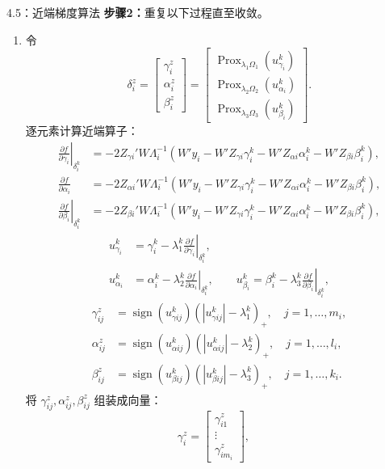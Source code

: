 \begin{bookalgorithm}{4.5：近端梯度算法}
\textbf{步骤2：}重复以下过程直至收敛。
\begin{enumerate}
\item 令
\[
\delta_i^z=\begin{bmatrix}\gamma_i^z\\\alpha_i^z\\\beta_i^z\end{bmatrix}
=\begin{bmatrix}
\operatorname{Prox}_{\lambda_1\Omega_1}(u_{\gamma_i}^k)\\
\operatorname{Prox}_{\lambda_2\Omega_2}(u_{\alpha_i}^k)\\
\operatorname{Prox}_{\lambda_3\Omega_3}(u_{\beta_i}^k)
\end{bmatrix}.
\]
逐元素计算近端算子：
\[
\begin{aligned}
\left.\frac{\partial f}{\partial\gamma_i}\right|_{\delta_i^k}
 &=-2Z_{\gamma i}'W\Lambda_i^{-1}
 (W'y_i-W'Z_{\gamma i}\gamma_i^k-W'Z_{\alpha i}\alpha_i^k-W'Z_{\beta i}\beta_i^k),\\
\frac{\partial f}{\partial\alpha_i}
 &=-2Z_{\alpha i}'W\Lambda_i^{-1}
 (W'y_i-W'Z_{\gamma i}\gamma_i^k-W'Z_{\alpha i}\alpha_i^k-W'Z_{\beta i}\beta_i^k),\\
\left.\frac{\partial f}{\partial\beta_i}\right|_{\delta_i^k}
 &=-2Z_{\beta i}'W\Lambda_i^{-1}
 (W'y_i-W'Z_{\gamma i}\gamma_i^k-W'Z_{\alpha i}\alpha_i^k-W'Z_{\beta i}\beta_i^k),
\end{aligned}
\]
\[
\begin{aligned}
u_{\gamma_i}^k&=\gamma_i^k-\lambda_1^k\left.\frac{\partial f}{\partial\gamma_i}\right|_{\delta_i^k},\\
u_{\alpha_i}^k&=\alpha_i^k-\lambda_2^k\left.\frac{\partial f}{\partial\alpha_i}\right|_{\delta_i^k},\qquad
u_{\beta_i}^k=\beta_i^k-\lambda_3^k\left.\frac{\partial f}{\partial\beta_i}\right|_{\delta_i^k},
\end{aligned}
\]
\[
\begin{aligned}
\gamma_{ij}^z&=\operatorname{sign}(u_{\gamma ij}^k)
(|u_{\gamma ij}^k|-\lambda_1^k)_+,\quad j=1,\ldots,m_i,\\
\alpha_{ij}^z&=\operatorname{sign}(u_{\alpha ij}^k)
(|u_{\alpha ij}^k|-\lambda_2^k)_+,\quad j=1,\ldots,l_i,\\
\beta_{ij}^z&=\operatorname{sign}(u_{\beta ij}^k)
(|u_{\beta ij}^k|-\lambda_3^k)_+,\quad j=1,\ldots,k_i.
\end{aligned}
\]
将 $\gamma_{ij}^z,\alpha_{ij}^z,\beta_{ij}^z$ 组装成向量：
\[
\gamma_i^z=\begin{bmatrix}\gamma_{i1}^z\\\vdots\\\gamma_{im_i}^z\end{bmatrix},\quad
\]
\end{enumerate}
\end{bookalgorithm}
